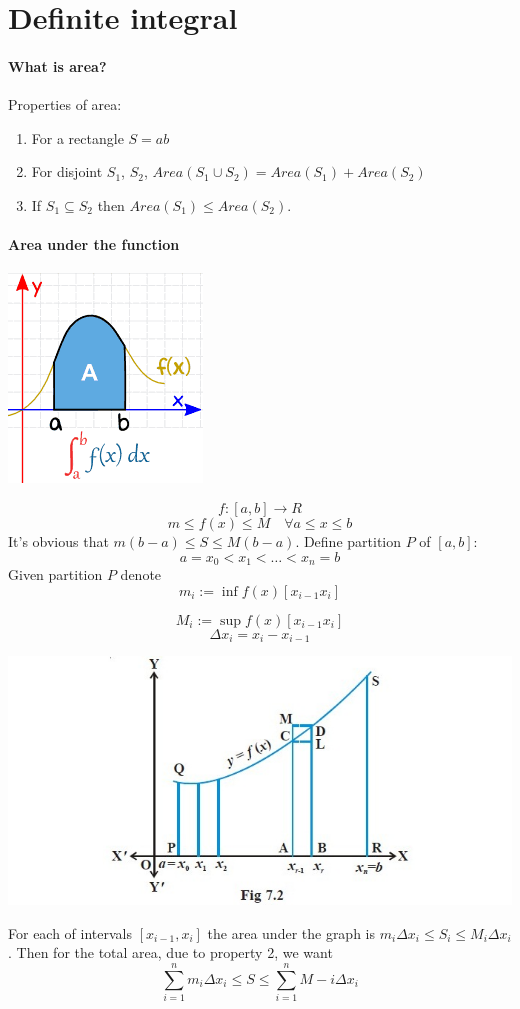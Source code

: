 \section{Definite integral}


\paragraph{What is area?}
Properties of area:
\begin{enumerate}
	\item For a rectangle $S=ab$
	\item For disjoint $S_1$, $S_2$, $Area(S_1 \cup S_2) = Area(S_1)+Area(S_2)$
	\item If $S_1 \subseteq S_2$ then $Area(S_1) \leq Area(S_2)$.
\end{enumerate}

\paragraph{Area under the function}

\begin{center}
	\includegraphics{./lect1/pic1.png}
\end{center}
$$f:[a,b] \to R$$
$$m \leq f(x) \leq M \quad \forall a \leq x \leq b$$
It's obvious that $m(b-a) \leq S\leq M(b-a)$. Define partition $P$ of $[a,b]$:
$$a=x_0<x_1<\dots<x_n=b$$
Given partition $P$ denote 
$$m_i := \inf f(x) [x_{i-1} x_{i}]$$

$$M_i := \sup f(x) [x_{i-1} x_{i}]$$
$$\Delta x_i = x_i - x_{i-1}$$

\begin{center}
	\includegraphics{./lect1/pic2.jpg}
\end{center}
For each of intervals $[x_{i-1}, x_i]$ the area under the graph is $m_i\Delta x_i \leq S_i \leq M_i \Delta x_i$. Then for the total area, due to property 2, we want
$$\sum_{i=1}^n m_i \Delta x_i \leq S \leq \sum_{i=1}^n M-i \Delta x_i$$

